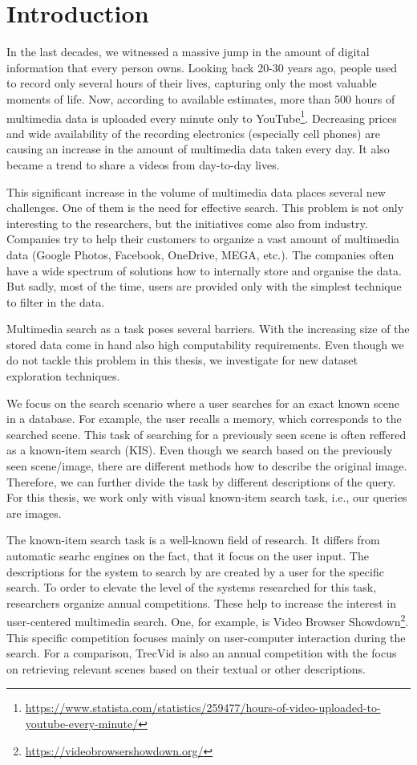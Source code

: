 \chapter*{Introduction}

In the last decades, we witnessed a massive jump in the amount of digital information that every person owns. Looking back 20-30 years ago, people used to record only several hours of their lives, capturing only the most valuable moments of life. Now, according to available estimates, more than 500 hours of multimedia data is uploaded every minute only to YouTube\footnote{\url{https://www.statista.com/statistics/259477/hours-of-video-uploaded-to-youtube-every-minute/}}. Decreasing prices and wide availability of the recording electronics (especially cell phones) are causing an increase in the amount of multimedia data taken every day. It also became a trend to share a videos from day-to-day lives.

This significant increase in the volume of multimedia data places several new challenges. One of them is the need for effective search. This problem is not only interesting to the researchers, but the initiatives come also from industry. Companies try to help their customers to organize a vast amount of multimedia data (Google Photos, Facebook, OneDrive, MEGA, etc.). The companies often have a wide spectrum of solutions how to internally store and organise the data. But sadly, most of the time, users are provided only with the simplest technique to filter in the data.

Multimedia search as a task poses several barriers. With the increasing size of the stored data come in hand also high computability requirements. Even though we do not tackle this problem in this thesis, we investigate for new dataset exploration techniques.

We focus on the search scenario where a user searches for an exact known scene in a database. For example, the user recalls a memory, which corresponds to the searched scene. This task of searching for a previously seen scene is often reffered as a known-item search (KIS). Even though we search based on the previously seen scene/image, there are different methods how to describe the original image. Therefore, we can further divide the task by different descriptions of the query. For this thesis, we work only with visual known-item search task, i.e., our queries are images.

The known-item search task is a well-known field of research. It differs from automatic searhc engines on the fact, that it focus on the user input. The descriptions for the system to search by are created by a user for the specific search. To order to elevate the level of the systems researched for this task, researchers organize annual competitions. These help to increase the interest in user-centered multimedia search. One, for example, is Video Browser Showdown\footnote{\url{https://videobrowsershowdown.org/}}. This specific competition focuses mainly on user-computer interaction during the search. For a comparison, TrecVid  is also an annual competition with the focus on retrieving relevant scenes based on their textual or other descriptions.

